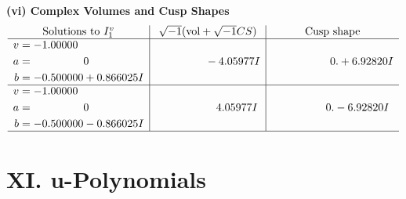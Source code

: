 \documentclass[1p]{elsarticle_modified}
\theoremstyle{definition}
\newcommand{\I}{\sqrt{-1}}
\begin{document}
\newpage\flushleft \textbf{(vi) Complex Volumes and Cusp Shapes}
$$\begin{array}{c|c|c}  
\text{Solutions to }I^v_{1}& \I (\text{vol} + \sqrt{-1}CS) & \text{Cusp shape}\\
 \hline 
\begin{aligned}
v &= -1.00000\phantom{ +0.000000I} \\
a &= \phantom{-0.000000 } 0 \\
b &= -0.500000 + 0.866025 I\end{aligned}
 & \phantom{-0.000000 } -4.05977 I & \phantom{-0.000000 -}0. + 6.92820 I \\ \hline\begin{aligned}
v &= -1.00000\phantom{ +0.000000I} \\
a &= \phantom{-0.000000 } 0 \\
b &= -0.500000 - 0.866025 I\end{aligned}
 & \phantom{-0.000000 -}4.05977 I & \phantom{-0.000000 } 0. - 6.92820 I\\
 \hline 
 \end{array}$$\newpage
\newpage\renewcommand{\arraystretch}{1}
\centering \section*{ XI. u-Polynomials}
\end{document}
